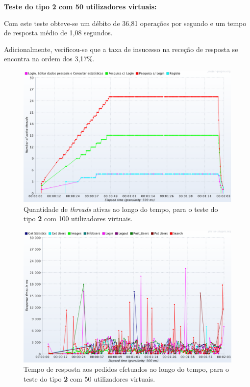 \vspace{0.5cm}
\noindent\textbf{Teste do tipo 2 com 50 utilizadores virtuais:}


Com este teste obteve-se um débito de 36,81 operações por segundo e um tempo de resposta médio de 1,08 segundos.

Adicionalmente, verificou-se que a taxa de insucesso na receção de resposta se encontra na ordem dos 3,17\%.

\begin{figure}[H]
    \centering
    \includegraphics[width=1\textwidth]{images/Testes/4PC_RU50T.png}
    \caption{Quantidade de \textit{threads} ativas ao longo do tempo, para o teste do tipo \textbf{2} com 100 utilizadores virtuais.}
    \label{fig:4PC_RU_50_threads}
\end{figure}

\begin{figure}[H]
    \centering
    \includegraphics[width=1\textwidth]{images/Testes/4PC_RU50R.png}
    \caption{Tempo de resposta aos pedidos efetuados ao longo do tempo, para o teste do tipo \textbf{2} com 50 utilizadores virtuais.}
    \label{fig:4PC_RU_50_response}
\end{figure}

